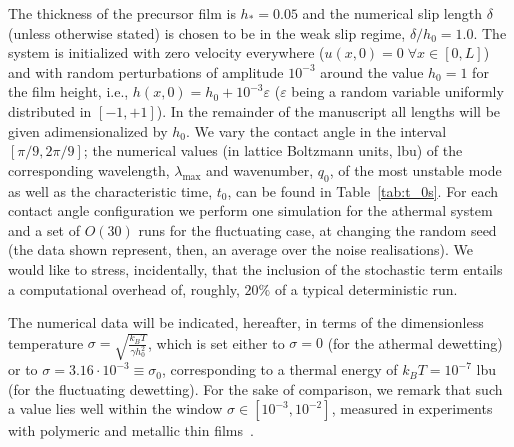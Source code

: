 The thickness of the precursor film is $h_{\ast} = 0.05$ and the numerical slip length $\delta$ (unless otherwise stated) is chosen to be in the weak slip regime, $\delta/h_0 = 1.0$. 
The system is initialized with zero velocity everywhere ($u(x,0)=0 \; \forall x \in [0, L]$) and with random perturbations of amplitude $10^{-3}$ around the value $h_0 = 1$ for the film height, i.e., $h(x,0) = h_0 + 10^{-3} \varepsilon$ ($\varepsilon$ being a random variable uniformly distributed in $[-1, +1]$).
In the remainder of the manuscript all lengths will be given adimensionalized by $h_0$.
We vary the contact angle in the interval $[\pi/9, 2\pi/9 ]$; the numerical values (in lattice Boltzmann units, lbu) of the corresponding wavelength, $\lambda_{\text{max}}$ and wavenumber, $q_0$, of the most unstable mode as well as the characteristic time, $t_0$, can be found in Table~\ref{tab:t_0s}.
For each contact angle configuration we perform one simulation for the athermal system and a set of $O(30)$ runs for the fluctuating case, at changing the random seed (the data shown represent, then, an average over the noise realisations). 
We would like to stress, incidentally, that the inclusion of the stochastic term entails a computational overhead of, roughly, $20\%$ of a typical deterministic run.

The numerical data will be indicated, hereafter, in terms of the dimensionless temperature $\sigma = \sqrt{\frac{k_B T}{\gamma h_0^2}}$, which is set either to $\sigma=0$ (for the athermal dewetting) or to $\sigma = 3.16 \cdot 10^{-3} \equiv \sigma_0$, corresponding to a thermal energy of $k_B T = 10^{-7}$ lbu (for the fluctuating dewetting). 
For the sake of comparison, we remark that such a value lies well within the window $\sigma \in [10^{-3}, 10^{-2}]$, measured in experiments with polymeric and metallic thin films~\cite{fetzerThermalNoiseInfluences2007,gonzalezInstabilityLiquidCu2013}.

